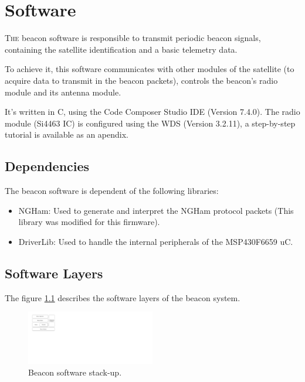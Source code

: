 \documentclass[12pt]{book}
\begin{document}

\chapter{Software}

\lettrine{T}{he} beacon software is responsible to transmit periodic beacon signals, containing the satellite identification and a basic telemetry data.

To achieve it, this software communicates with other modules of the satellite (to acquire data to transmit in the beacon packets), controls the beacon's radio module and its antenna module.

It's written in C, using the Code Composer Studio IDE (Version 7.4.0). The radio module (Si4463 IC) is configured using the WDS (Version 3.2.11), a step-by-step tutorial is available as an apendix.

\section{Dependencies}

The beacon software is dependent of the following libraries:

\begin{itemize}
    \item NGHam: Used to generate and interpret the NGHam protocol packets (This library was modified for this firmware).
    \item DriverLib: Used to handle the internal peripherals of the MSP430F6659 uC.
\end{itemize}


\section{Software Layers}

The figure \ref{fig:beacon-software-layers} describes the software layers of the beacon system.

\begin{figure}[!h]
	\begin{center}
		\includegraphics[width=0.5\textwidth]{figures/beacon_software_layers.pdf}
		\caption{Beacon software stack-up.}
		\label{fig:beacon-software-layers}
	\end{center}
\end{figure}
\end{document}
